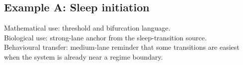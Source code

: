 \subsection*{Example A: Sleep initiation}

Mathematical use: threshold and bifurcation language.\\
Biological use: strong-lane anchor from the sleep-transition source.\\
Behavioural transfer: medium-lane reminder that some transitions are easiest
when the system is already near a regime boundary.
